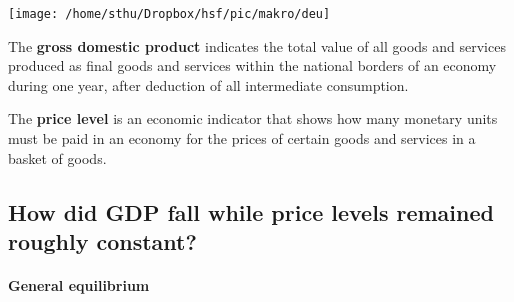 
\begin{minipage}{0.6\textwidth}
\begin{center}
	\texttt{[image: /home/sthu/Dropbox/hsf/pic/makro/deu]}\label{fig:deu}
\end{center}
\end{minipage}
\begin{minipage}{0.4\textwidth}
The \textbf{gross domestic product} indicates the total value of all goods and services produced as final goods and services within the national borders of an economy during one year, after deduction of all intermediate consumption.

The \textbf{price level} is an economic indicator that shows how many monetary units must be paid in an economy for the prices of certain goods and services in a basket of goods.  
\end{minipage}


\pbn
\subsection{How did GDP fall while price levels remained roughly constant?}


\paragraph{General equilibrium}

